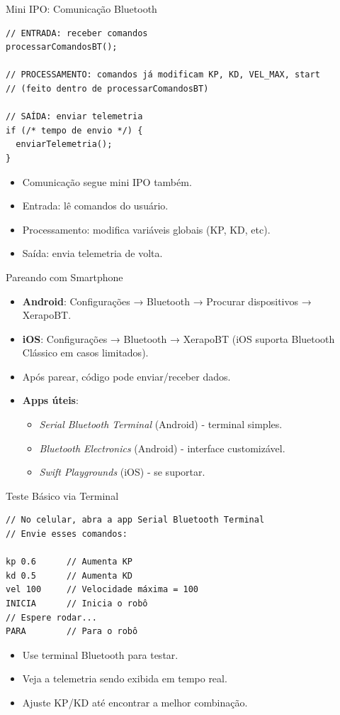\documentclass[10pt]{beamer}
\begin{document}
\begin{frame}[fragile]{Mini IPO: Comunicação Bluetooth}
\begin{lstlisting}
// ENTRADA: receber comandos
processarComandosBT();

// PROCESSAMENTO: comandos já modificam KP, KD, VEL_MAX, start
// (feito dentro de processarComandosBT)

// SAÍDA: enviar telemetria
if (/* tempo de envio */) {
  enviarTelemetria();
}
\end{lstlisting}

  \begin{itemize}
    \item Comunicação segue mini IPO também.
    \item Entrada: lê comandos do usuário.
    \item Processamento: modifica variáveis globais (KP, KD, etc).
    \item Saída: envia telemetria de volta.
  \end{itemize}
\end{frame}

\begin{frame}{Pareando com Smartphone}
  \begin{itemize}
    \item \textbf{Android}: Configurações → Bluetooth → Procurar dispositivos → XerapoBT.
    \item \textbf{iOS}: Configurações → Bluetooth → XerapoBT (iOS suporta Bluetooth Clássico em casos limitados).
    \item Após parear, código pode enviar/receber dados.
    \item \textbf{Apps úteis}: 
    \begin{itemize}
      \item \textit{Serial Bluetooth Terminal} (Android) - terminal simples.
      \item \textit{Bluetooth Electronics} (Android) - interface customizável.
      \item \textit{Swift Playgrounds} (iOS) - se suportar.
    \end{itemize}
  \end{itemize}
\end{frame}

\begin{frame}[fragile]{Teste Básico via Terminal}
\begin{lstlisting}
// No celular, abra a app Serial Bluetooth Terminal
// Envie esses comandos:

kp 0.6      // Aumenta KP
kd 0.5      // Aumenta KD
vel 100     // Velocidade máxima = 100
INICIA      // Inicia o robô
// Espere rodar...
PARA        // Para o robô
\end{lstlisting}

  \begin{itemize}
    \item Use terminal Bluetooth para testar.
    \item Veja a telemetria sendo exibida em tempo real.
    \item Ajuste KP/KD até encontrar a melhor combinação.
  \end{itemize}
\end{frame}
\end{document}
